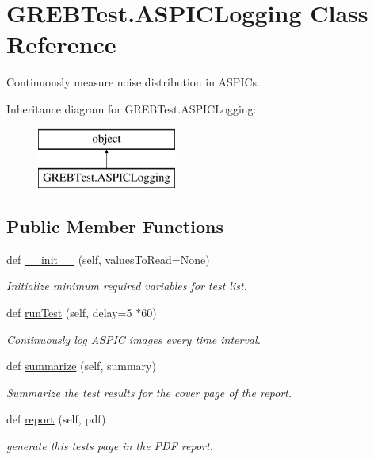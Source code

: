 \hypertarget{class_g_r_e_b_test_1_1_a_s_p_i_c_logging}{}\section{G\+R\+E\+B\+Test.\+A\+S\+P\+I\+C\+Logging Class Reference}
\label{class_g_r_e_b_test_1_1_a_s_p_i_c_logging}


Continuously measure noise distribution in A\+S\+P\+I\+Cs.  


Inheritance diagram for G\+R\+E\+B\+Test.\+A\+S\+P\+I\+C\+Logging\+:\begin{figure}[H]
\begin{center}
\leavevmode
\includegraphics[height=2.000000cm]{class_g_r_e_b_test_1_1_a_s_p_i_c_logging}
\end{center}
\end{figure}
\subsection*{Public Member Functions}
\begin{DoxyCompactItemize}
\item 
def \hyperlink{class_g_r_e_b_test_1_1_a_s_p_i_c_logging_a009d36147be8ad7628f5c7cd099759a7}{\+\_\+\+\_\+init\+\_\+\+\_\+} (self, values\+To\+Read=None)
\begin{DoxyCompactList}\small\item\em Initialize minimum required variables for test list. \end{DoxyCompactList}\item 
def \hyperlink{class_g_r_e_b_test_1_1_a_s_p_i_c_logging_a649325e8307acc4e94aa21d5c5b3d311}{run\+Test} (self, delay=5 $\ast$60)
\begin{DoxyCompactList}\small\item\em Continuously log A\+S\+P\+IC images every time interval. \end{DoxyCompactList}\item 
def \hyperlink{class_g_r_e_b_test_1_1_a_s_p_i_c_logging_a86d905193d1549a3b86f4bca8e94fc4d}{summarize} (self, summary)
\begin{DoxyCompactList}\small\item\em Summarize the test results for the cover page of the report. \end{DoxyCompactList}\item 
def \hyperlink{class_g_r_e_b_test_1_1_a_s_p_i_c_logging_a4d12b049f243febdec8b378cda8ae885}{report} (self, pdf)
\begin{DoxyCompactList}\small\item\em generate this test\textquotesingle{}s page in the P\+DF report. \end{DoxyCompactList}\end{DoxyCompactItemize}


